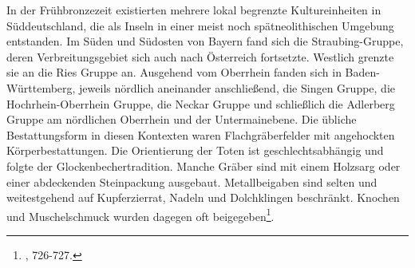 \documentclass[openany,twoside,twocolumn]{book}
\let\rmarkdownfootnote\footnote%
\def\footnote{\protect\rmarkdownfootnote}
\begin{document}
In der Frühbronzezeit existierten mehrere lokal begrenzte
Kultureinheiten in Süddeutschland, die als Inseln in einer meist noch
spätneolithischen Umgebung entstanden. Im Süden und Südosten von Bayern
fand sich die Straubing-Gruppe, deren Verbreitungsgebiet sich auch nach
Österreich fortsetzte. Westlich grenzte sie an die Ries Gruppe an.
Ausgehend vom Oberrhein fanden sich in Baden-Württemberg, jeweils
nördlich aneinander anschließend, die Singen Gruppe, die
Hochrhein-Oberrhein Gruppe, die Neckar Gruppe und schließlich die
Adlerberg Gruppe am nördlichen Oberrhein und der Untermainebene. Die
übliche Bestattungsform in diesen Kontexten waren Flachgräberfelder mit
angehockten Körperbestattungen. Die Orientierung der Toten ist
geschlechtsabhängig und folgte der Glockenbechertradition. Manche Gräber
sind mit einem Holzsarg oder einer abdeckenden Steinpackung ausgebaut.
Metallbeigaben sind selten und weitestgehend auf Kupferzierrat, Nadeln
und Dolchklingen beschränkt. Knochen und Muschelschmuck wurden dagegen
oft beigegeben\footnote{\textcite{jockenhovel_germany_2013}, 726-727.}.
\end{document}
